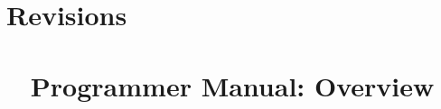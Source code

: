 \documentclass{dabcclass}
\begin{document}
\chapter{Revisions}

\cleardoublepage
\thispagestyle{empty} \tableofcontents
\thispagestyle{empty} \cleardoublepage
\chapter{\dabc~ Programmer Manual: Overview}
 \cleardoublepage


\end{document}
